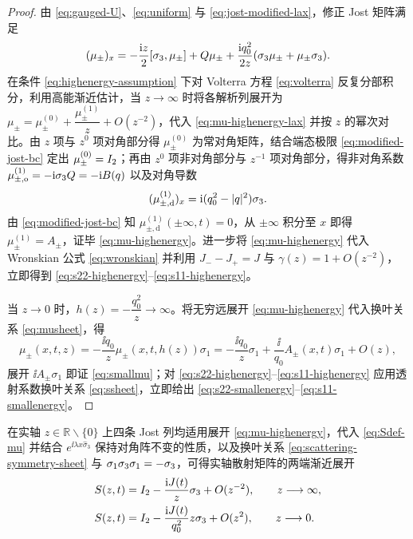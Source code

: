 \begin{proof}
由 \eqref{eq:gauged-U}、\eqref{eq:uniform} 与 \eqref{eq:jost-modified-lax}，修正 Jost 矩阵满足
\begin{equation}\label{eq:mu-highenergy-lax}
(\mu_\pm)_x=-\dfrac{\mathrm{i} z}{2}[\sigma_3,\mu_\pm]+Q\mu_\pm
+\dfrac{\mathrm{i} q_0^2}{2z}(\sigma_3\mu_\pm+\mu_\pm\sigma_3).
\end{equation}
在条件 \eqref{eq:highenergy-assumption} 下对 Volterra 方程 \eqref{eq:volterra} 反复分部积分，利用高能渐近估计\cite{BGKL2019}，当 $z\to\infty$ 时将各解析列展开为 $\mu_\pm=\mu_\pm^{(0)}+\dfrac{\mu_\pm^{(1)}}{z}+O(z^{-2})$，代入 \eqref{eq:mu-highenergy-lax} 并按 $z$ 的幂次对比。由 $z$ 项与 $z^0$ 项对角部分得 $\mu_\pm^{(0)}$ 为常对角矩阵，结合端态极限 \eqref{eq:modified-jost-bc} 定出 $\mu_\pm^{(0)}=I_2$；再由 $z^0$ 项非对角部分与 $z^{-1}$ 项对角部分，得非对角系数 $\mu_{\pm,\mathrm o}^{(1)}=-\mathrm{i}\sigma_3 Q=-\mathrm{i} B(q)$ 以及对角导数
\begin{equation*}
(\mu_{\pm,\mathrm d}^{(1)})_x=\mathrm{i}(q_0^2-|q|^2)\sigma_3.
\end{equation*}
由 \eqref{eq:modified-jost-bc} 知 $\mu_{\pm,\mathrm d}^{(1)}(\pm\infty,t)=0$，从 $\pm\infty$ 积分至 $x$ 即得 $\mu_\pm^{(1)}=A_\pm$，证毕 \eqref{eq:mu-highenergy}。进一步将 \eqref{eq:mu-highenergy} 代入 Wronskian 公式 \eqref{eq:wronskian} 并利用 $J_--J_+=J$ 与 $\gamma(z)=1+O(z^{-2})$，立即得到 \eqref{eq:s22-highenergy}--\eqref{eq:s11-highenergy}。

当 $z\to0$ 时，$h(z)=-\dfrac{q_0^2}{z}\to\infty$。将无穷远展开 \eqref{eq:mu-highenergy} 代入换叶关系 \eqref{eq:musheet}，得
\begin{equation*}
\mu_\pm(x,t,z)=-\dfrac{\ii q_0}{z}\mu_\pm(x,t,h(z))\sigma_1
=-\dfrac{\ii q_0}{z}\sigma_1+\dfrac{\ii}{q_0}A_\pm(x,t)\sigma_1+O(z),
\end{equation*}
展开 $\ii A_\pm\sigma_1$ 即证 \eqref{eq:smallmu}；对 \eqref{eq:s22-highenergy}--\eqref{eq:s11-highenergy} 应用透射系数换叶关系 \eqref{eq:ssheet}，立即给出 \eqref{eq:s22-smallenergy}--\eqref{eq:s11-smallenergy}。
\end{proof}

\begin{remark}
在实轴 $z\in\mathbb R\mathbin{\backslash}\{0\}$ 上四条 Jost 列均适用展开 \eqref{eq:mu-highenergy}，代入 \eqref{eq:Sdef-mu} 并结合 $e^{\ii\lambda x\widehat{\sigma}_3}$ 保持对角阵不变的性质，以及换叶关系 \eqref{eq:scattering-symmetry-sheet} 与 $\sigma_1\sigma_3\sigma_1=-\sigma_3$，可得实轴散射矩阵的两端渐近展开
\begin{align}
&S(z,t)=I_2-\dfrac{\mathrm{i} J(t)}{z}\sigma_3+O(z^{-2}),\qquad z\longrightarrow\infty,\label{eq:scattering-highenergy}\\
&S(z,t)=I_2-\dfrac{\mathrm{i} J(t)}{q_0^2}z\sigma_3+O(z^2),\qquad z\longrightarrow0.\label{eq:scattering-smallenergy}
\end{align}
\end{remark}
